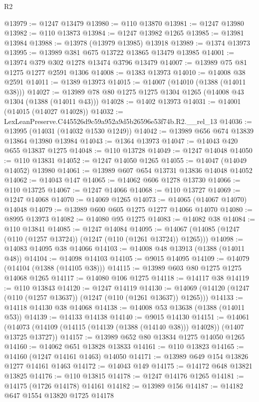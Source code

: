 \begin{lexlean}{R2}
\begin{coremodule}
@13979 := @1247 @13479
@13980 := @110 @13870
@13981 := @1247 @13980
@13982 := @110 @13873
@13984 := @1247 @13982 @1265
@13985 := @13981 @13984
@13988 := @13978 (@13979 @13985) @13918
@13989 := @1374 @13973
@13995 := @13989 @381 @675 @13722 @13865 @13479 @13985
@14001 := @13974 @379 @302 @1278 @13474 @3796 @13479
@14007 := @13989 @75 @81 @1275 @1277 @2591 @1306
@14008 := @1383 @13973
@14010 := @14008 @38 @2591
@14011 := @1389 @13973
@14015 := @14007 (@14010 (@1388 (@14011 @38)))
@14027 := @13989 @78 @80 @1275 @1275 @1304 @1265 (@14008 @43 @1304 (@1388 (@14011 @43)))
@14028 := @1402 @13973
@14031 := @14001 (@14015 (@14027 @14028))
@14032 := LexLeanPreserve.C445526d9c59a952a9d5b26596e53f74b.R2.__rel_13
@14036 := @13995 (@14031 (@14032 @1530 @1249))
@14042 := @13989 @656 @674 @13839 @13864 @13980 @13984
@14043 := @1364 @13973
@14047 := @14043 @420 @655 @13837 @1275
@14048 := @110 @13728
@14049 := @1247 @14048
@14050 := @110 @13831
@14052 := @1247 @14050 @1265
@14055 := @14047 (@14049 @14052) @13980
@14061 := @13989 @607 @654 @13731 @13836 @14048 @14052
@14062 := @14043 @147
@14065 := @14062 @606 @1278 @13730
@14066 := @110 @13725
@14067 := @1247 @14066
@14068 := @110 @13727
@14069 := @1247 @14068
@14070 := @14069 @1265
@14073 := @14065 (@14067 @14070) @14048
@14079 := @13989 @600 @605 @1275 @1277 @14066 @14070
@14080 := @8995 @13973
@14082 := @14080 @95 @1275
@14083 := @14082 @38
@14084 := @110 @13841
@14085 := @1247 @14084
@14095 := @14067 (@14085 (@1247 (@110 (@1257 @13724)) (@1247 (@110 (@1261 @13724)) @1265)))
@14098 := @14083 @14095 @38 @14066
@14103 := @14008 @48 @13913 (@1388 (@14011 @48))
@14104 := @14098 @14103
@14105 := @9015 @14095
@14109 := @14079 (@14104 (@1388 (@14105 @38)))
@14115 := @13989 @603 @80 @1275 @1275 @14068 @1265
@14117 := @14080 @106 @1275
@14118 := @14117 @38
@14119 := @110 @13843
@14120 := @1247 @14119
@14130 := @14069 (@14120 (@1247 (@110 (@1257 @13637)) (@1247 (@110 (@1261 @13637)) @1265)))
@14133 := @14118 @14130 @38 @14068
@14138 := @14008 @53 @13638 (@1388 (@14011 @53))
@14139 := @14133 @14138
@14140 := @9015 @14130
@14151 := @14061
    (@14073 (@14109 (@14115 (@14139 (@1388 (@14140 @38))) @14028)) (@1407 @13725 @13727))
@14157 := @13989 @652 @80 @13834 @1275 @14050 @1265
@14160 := @14062 @651 @13828 @13833
@14161 := @110 @13823
@14165 := @14160 (@1247 @14161 @1463) @14050
@14171 := @13989 @649 @154 @13826 @1277 @14161 @1463
@14172 := @14043 @149
@14175 := @14172 @648 @13821 @13825
@14176 := @110 @13815
@14178 := @1247 @14176 @1265
@14181 := @14175 (@1726 @14178) @14161
@14182 := @13989 @156
@14187 := @14182 @647 @1554 @13820 @1725 @14178

\end{coremodule}
\end{lexlean}
